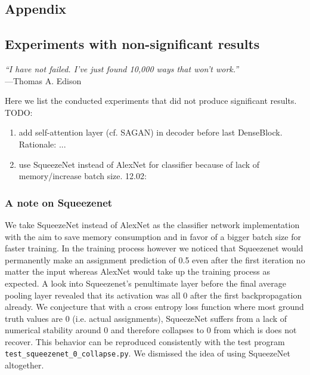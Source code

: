 \documentclass[12pt,a4paper]{article}
\begin{document}
\begin{appendices}
\section{Appendix}
\subsection{Experiments with non-significant results}\label{app:failed_exps}
\begin{flushright}
\rightskip=2.8cm\textit{``I have not failed. I've just found 10,000 ways that won't work.''} \\
\vspace{.2em}
\rightskip=1.8cm---Thomas A. Edison
\end{flushright}
Here we list the conducted experiments that did not produce significant results. TODO:
\begin{enumerate}
  \item add self-attention layer (cf. SAGAN) in decoder before last DenseBlock. Rationale: ...
  \item use SqueezeNet instead of AlexNet for classifier because of lack of memory/increase batch size. 12.02: 
\end{enumerate}


\subsubsection{A note on Squeezenet}
We take SqueezeNet \cite{SqueezeNet} instead of AlexNet as the classifier network implementation with the aim to save memory consumption and in favor of a bigger batch size for faster training. In the training process however we noticed that Squeezenet would permanently make an assignment prediction of 0.5 even after the first iteration no matter the input whereas AlexNet would take up the training process as expected. A look into Squeezenet's penultimate layer before the final average pooling layer revealed that its activation was all 0 after the first backpropagation already. We conjecture that with a cross entropy loss function where most ground truth values are 0 (i.e. actual assignments), SqueezeNet suffers from a lack of numerical stability around 0 and therefore collapses to 0 from which is does not recover. This behavior can be reproduced consistently with the test program \texttt{test\_squeezenet\_0\_collapse.py}. We dismissed the idea of using SqueezeNet altogether.



\end{appendices}
\end{document}
